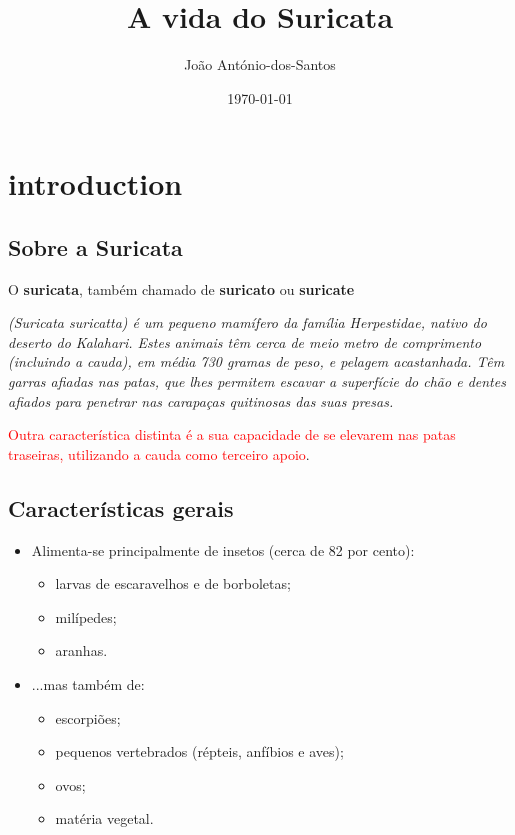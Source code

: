 \documentclass[a4paper,11pt,twoside]{report}
\begin{document}
\title{A vida do Suricata}
\author{João António-dos-Santos}
\date {\today}
\maketitle

\chapter{introduction}
{

\section {Sobre a Suricata}


{O { \bf{suricata}}, também chamado de   { \bf{suricato}} ou { \bf{suricate}} { \it{(Suricata suricatta}) é um pequeno mamífero da família {\it {Herpestidae}}, nativo do deserto do Kalahari. Estes animais têm cerca de meio metro de comprimento (incluindo a cauda), em média 730 gramas de peso, e pelagem acastanhada. Têm garras afiadas nas patas, que lhes permitem escavar a superfície do chão e dentes afiados para penetrar nas carapaças quitinosas das suas presas. {\textcolor{red} {Outra característica distinta é a sua capacidade de se elevarem nas patas traseiras, utilizando a cauda como terceiro apoio}.



\section{Características gerais}

\begin{itemize}
    \item Alimenta-se principalmente de insetos (cerca de 82 por cento):
    \begin{itemize}
        \item larvas de escaravelhos e de borboletas;
        \item milípedes;
        \item aranhas.
    \end{itemize}
    
    \item ...mas também de:
    \begin{itemize}
        \item escorpiões;
        \item pequenos vertebrados (répteis, anfíbios e aves);
        \item ovos;
        \item matéria vegetal.
    \end{itemize}
    

\end{itemize}}}}}
\end{document}

